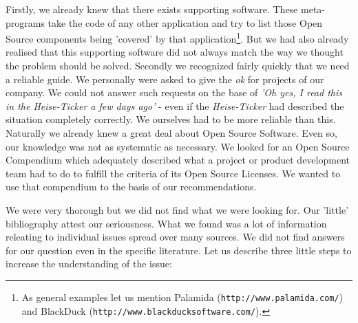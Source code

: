 Firstly, we already knew that there exists supporting software. These
meta-pro\-grams take the code of any other application and try to list those
Open Source components being 'covered' by that application\footnote{As general
examples let us mention Palamida (\texttt{http://www.palamida.com/}) and
BlackDuck (\texttt{http://www.blackducksoftware.com/}).}. But we had also
already realised that this supporting software did not always match the way we
thought the problem should be solved. Secondly we recognized fairly quickly that
we need a reliable guide. We personally were asked to give the \emph{ok} for
projects of our company. We could not answer such requests on the base of
\textit{'Oh yes, I read this in the \emph{Heise-Ticker} a few days ago'} - even
if the \emph{Heise-Ticker} had described the situation completely correctly. We
ourselves had to be more reliable than this. Naturally we already knew a great
deal about Open Source Software. Even so, our knowledge was not as systematic as
necessary. We looked for an Open Source Compendium which adequately described
what a project or product development team had to do to fulfill the criteria of
its Open Source Licenses. We wanted to use that compendium to the basis of our
recommendations.

We were very thorough but we did not find what we were looking for. Our 'little'
bibliography attest our seriousness. What we found was a lot of information
releating to individual issues spread over many sources. We did not find answers
for our question even in the specific literature. Let us describe three little
steps to increase the understanding of the issue:


